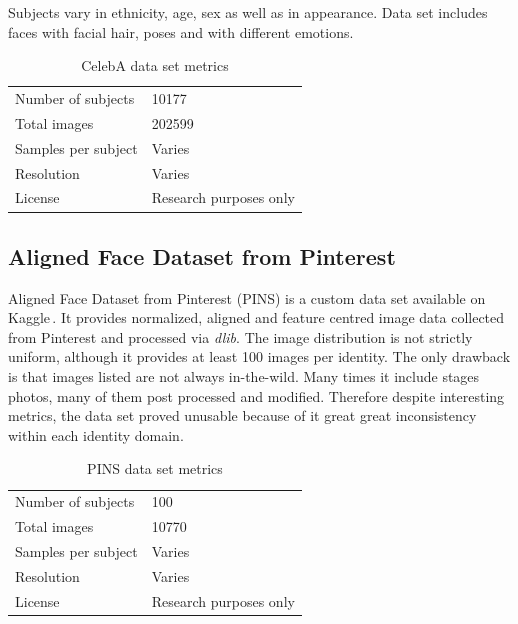 Subjects vary in ethnicity, age, sex as well as in appearance. Data set includes faces with facial hair, poses and with different emotions.

\begin{table}[ht]
    \centering
    \begin{tabularx}{.8\textwidth}{l|X}
        \toprule
        Number of subjects & \num{10177} \\
        Total images & \num{202599} \\
        Samples per subject & Varies \\
        Resolution & Varies \\
        License & Research purposes only \\
        \bottomrule
    \end{tabularx}
    \caption{CelebA data set metrics}
\end{table}

\subsection{Aligned Face Dataset from Pinterest}
\label{ss:pins}

Aligned Face Dataset from Pinterest (PINS) is a custom data set available on Kaggle\,\cite{pins}. It provides normalized, aligned and feature centred image data collected from Pinterest and processed via \textit{dlib}. The image distribution is not strictly uniform, although it provides at least 100 images per identity. The only drawback is that images listed are not always in-the-wild. Many times it include stages photos, many of them post processed and modified. Therefore despite interesting metrics, the data set proved unusable because of it great great inconsistency within each identity domain.

\begin{table}[ht]
    \centering
    \begin{tabularx}{.8\textwidth}{l|X}
        \toprule
        Number of subjects & \num{100} \\
        Total images & \num{10770} \\
        Samples per subject & Varies \\
        Resolution & Varies \\
        License & Research purposes only \\
        \bottomrule
    \end{tabularx}
    \caption{PINS data set metrics}
\end{table}
